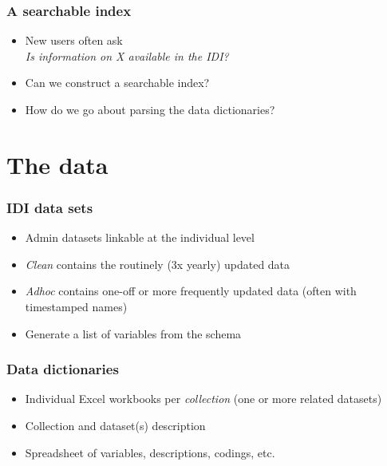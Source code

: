 \documentclass{beamer}
\begin{document}
\begin{frame}
    \frametitle{A searchable index}

    \begin{itemize}
        \item New users often ask \\\emph{Is information on X available in the IDI?}
        \item Can we construct a searchable index?
        \item How do we go about parsing the data dictionaries?
    \end{itemize}
\end{frame}

\section{The data}

\begin{frame}
    \frametitle{IDI data sets}

    \begin{itemize}
        \item Admin datasets linkable at the individual level
        \item \emph{Clean} contains the routinely (3x yearly) updated data
        \item \emph{Adhoc} contains one-off or more frequently updated data (often with timestamped names)
        \item Generate a list of variables from the schema
    \end{itemize}

\end{frame}

\begin{frame}
    \frametitle{Data dictionaries}

    \begin{itemize}
        \item Individual Excel workbooks per \emph{collection} (one or more related datasets)
        \item Collection and dataset(s) description
        \item Spreadsheet of variables, descriptions, codings, etc.
    \end{itemize}

\end{frame}
\end{document}
